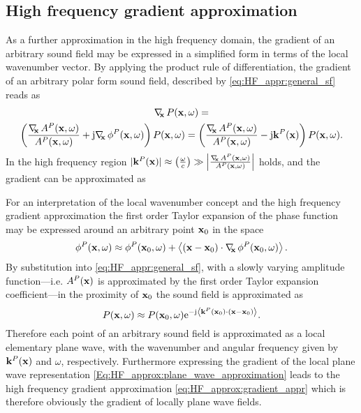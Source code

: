 \subsection{High frequency gradient approximation}
As a further approximation in the high frequency domain, the gradient of an arbitrary sound field may be expressed in a simplified form in terms of the local wavenumber vector.
By applying the product rule of differentiation, the gradient of an arbitrary polar form sound field, described by \eqref{eq:HF_appr:general_sf} reads as
\begin{multline}
\Dx P(\vx,\omega) = \\ \left(  \frac{\Dx A^P(\vx,\omega)}{A^P(\vx,\omega)} + \ti \Dx \phi^P(\vx,\omega) \right) P(\vx,\omega) =  \left(  \frac{\Dx A^P(\vx,\omega)}{A^P(\vx,\omega)} - \ti \vk^P(\vx) \right) P(\vx,\omega).
\end{multline}
In the high frequency region $|\mathbf{k}^P(\mathbf{x})| \approx \left( \frac{\omega}{c} \right) \gg \left| \frac{ \nabla_{\!\!\mathbf{x}}\, A^P(\mathbf{x},\omega)}{A^P(\mathbf{x},\omega)} \right|$ holds, and the gradient can be approximated as

\vspace{3mm}
For an interpretation of the local wavenumber concept and the high frequency gradient approximation the first order Taylor expansion of the phase function may be expressed around an arbitrary point $\mathbf{x}_0$ in the space
\begin{equation}
\phi^P(\mathbf{x},\omega) \approx \phi^P(\mathbf{x}_0,\omega) + \left< (\mathbf{x}-\mathbf{x}_0) \cdot \nabla_{\!\!\mathbf{x}}\, \phi^P(\mathbf{x}_0,\omega) \right>.
\end{equation}
By substitution into \eqref{eq:HF_appr:general_sf}, with a slowly varying amplitude function---i.e. $A^P(\mathbf{x})$ is approximated by the first order Taylor expansion coefficient---in the proximity of $\mathbf{x}_0$ the sound field is approximated as
\begin{equation}
\label{Eq:HF_approx:plane_wave_approximation}
P(\mathbf{x},\omega) \approx P(\mathbf{x}_0,\omega) \mathrm{e}^{-\mathrm{j}  \left< \mathbf{k}^P(\mathbf{x}_0) \cdot \left( \mathbf{x} - \mathbf{x}_0 \right) \right>}.
\end{equation}
Therefore each point of an arbitrary sound field is approximated as a local elementary plane wave, with the wavenumber and angular frequency given by $\mathbf{k}^P(\mathbf{x})$ and $\omega$, respectively.
Furthermore expressing the gradient of the local plane wave representation \eqref{Eq:HF_approx:plane_wave_approximation} leads to the high frequency gradient approximation \eqref{eq:HF_approx:gradient_appr} which is therefore obviously the gradient of locally plane wave fields.

